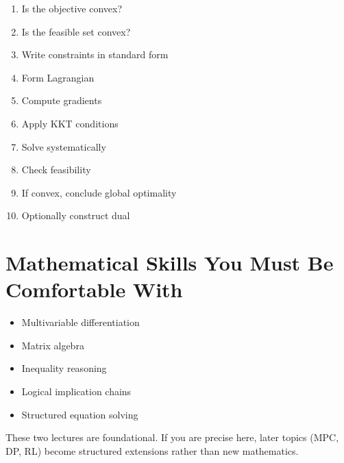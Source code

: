 \documentclass[11pt]{article}
\begin{document}
\begin{enumerate}
\item Is the objective convex?
\item Is the feasible set convex?
\item Write constraints in standard form
\item Form Lagrangian
\item Compute gradients
\item Apply KKT conditions
\item Solve systematically
\item Check feasibility
\item If convex, conclude global optimality
\item Optionally construct dual
\end{enumerate}

\newpage

\section*{Mathematical Skills You Must Be Comfortable With}

\begin{itemize}
\item Multivariable differentiation
\item Matrix algebra
\item Inequality reasoning
\item Logical implication chains
\item Structured equation solving
\end{itemize}

These two lectures are foundational. If you are precise here, later topics (MPC, DP, RL) become structured extensions rather than new mathematics.
\end{document}
